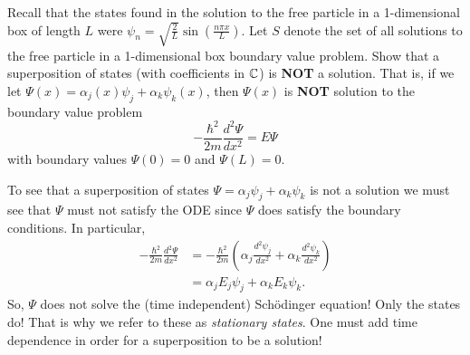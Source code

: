\documentclass[12pt]{article} %
\begin{document}
\newpage
\begin{problem}
Recall that the states found in the solution to the free particle in a 1-dimensional box of length $L$ were $\psi_n = \sqrt{\frac{2}{L}} \sin \left( \frac{n\pi x}{L}\right)$. Let $S$ denote the set of all solutions to the free particle in a 1-dimensional box boundary value problem. Show that a superposition of states (with coefficients in $\mathbb{C}$) is \textbf{NOT} a solution. That is, if we let $\Psi(x) = \alpha_{j}(x) \psi_j + \alpha_k \psi_k(x)$, then $\Psi(x)$ is \textbf{NOT} solution to the boundary value problem
\[
-\frac{\hbar^2}{2m}\frac{d^2 \Psi}{dx^2}=E\Psi
\]
with boundary values $\Psi(0)=0$ and $\Psi(L)=0$.
\end{problem}
\begin{solution}
    To see that a superposition of states $\Psi = \alpha_j \psi_j + \alpha_k \psi_k$ is not a solution we must see that $\Psi$ must not satisfy the ODE since $\Psi$ does satisfy the boundary conditions.  In particular,
        \begin{align*}
            -\frac{\hbar^2}{2m} \frac{d^2 \Psi}{dx^2} &=  -\frac{\hbar^2}{2m} \left(\alpha_j \frac{d^2 \psi_j}{dx^2} + \alpha_k \frac{d^2 \psi_k}{dx^2} \right)\\
            &= \alpha_j E_j \psi_j + \alpha_k E_k \psi_k.
        \end{align*}
        So, $\Psi$ does not solve the (time independent) Sch\"odinger equation! Only the states do!  That is why we refer to these as \emph{stationary states}.  One must add time dependence in order for a superposition to be a solution!
\end{solution}
\end{document}
